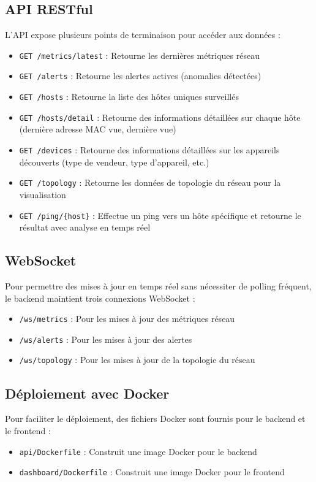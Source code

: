 \documentclass[12pt,a4paper]{report}
\begin{document}
\subsection{API RESTful}
L'API expose plusieurs points de terminaison pour accéder aux données :
\begin{itemize}
    \item \texttt{GET /metrics/latest} : Retourne les dernières métriques réseau
    \item \texttt{GET /alerts} : Retourne les alertes actives (anomalies détectées)
    \item \texttt{GET /hosts} : Retourne la liste des hôtes uniques surveillés
    \item \texttt{GET /hosts/detail} : Retourne des informations détaillées sur chaque hôte (dernière adresse MAC vue, dernière vue)
    \item \texttt{GET /devices} : Retourne des informations détaillées sur les appareils découverts (type de vendeur, type d'appareil, etc.)
    \item \texttt{GET /topology} : Retourne les données de topologie du réseau pour la visualisation
    \item \texttt{GET /ping/\{host\}} : Effectue un ping vers un hôte spécifique et retourne le résultat avec analyse en temps réel
\end{itemize}

\subsection{WebSocket}
Pour permettre des mises à jour en temps réel sans nécessiter de polling fréquent, le backend maintient trois connexions WebSocket :
\begin{itemize}
    \item \texttt{/ws/metrics} : Pour les mises à jour des métriques réseau
    \item \texttt{/ws/alerts} : Pour les mises à jour des alertes
    \item \texttt{/ws/topology} : Pour les mises à jour de la topologie du réseau
\end{itemize}

\subsection{Déploiement avec Docker}
Pour faciliter le déploiement, des fichiers Docker sont fournis pour le backend et le frontend :
\begin{itemize}
    \item \texttt{api/Dockerfile} : Construit une image Docker pour le backend
    \item \texttt{dashboard/Dockerfile} : Construit une image Docker pour le frontend
\end{itemize}
\end{document}
